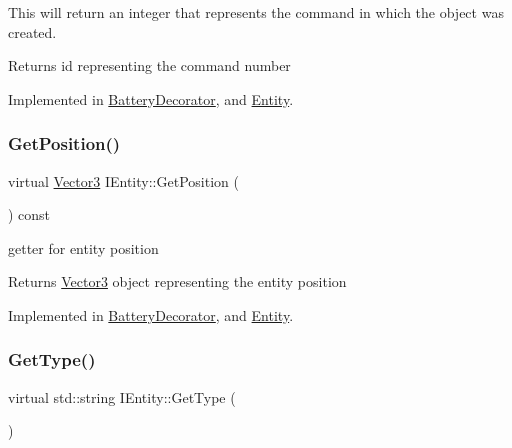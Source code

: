 This will return an integer that represents the command in which the object was created. 

\begin{DoxyReturn}{Returns}
id representing the command number 
\end{DoxyReturn}


Implemented in \hyperlink{classBatteryDecorator_a0a9d1aedcbbff75c0a88612cb4604fb3}{Battery\+Decorator}, and \hyperlink{classEntity_a0040a9ca2da893a4eccec20f542220a9}{Entity}.

\mbox{\label{classIEntity_a9bc32587aab91761fc0e718612498199}} 
\subsubsection{\texorpdfstring{Get\+Position()}{GetPosition()}}
{\footnotesize\ttfamily virtual \hyperlink{classVector3}{Vector3} I\+Entity\+::\+Get\+Position (\begin{DoxyParamCaption}{ }\end{DoxyParamCaption}) const\hspace{0.3cm}{\ttfamily [pure virtual]}}



getter for entity position 

\begin{DoxyReturn}{Returns}
\hyperlink{classVector3}{Vector3} object representing the entity position 
\end{DoxyReturn}


Implemented in \hyperlink{classBatteryDecorator_aaf2487adf2d58e855268877427cf5ba9}{Battery\+Decorator}, and \hyperlink{classEntity_ac6916016f6b9b4b4d18fd988a373fddb}{Entity}.

\mbox{\label{classIEntity_ac494bb9712d5a03495a1a95afdbd7153}} 
\subsubsection{\texorpdfstring{Get\+Type()}{GetType()}}
{\footnotesize\ttfamily virtual std\+::string I\+Entity\+::\+Get\+Type (\begin{DoxyParamCaption}{ }\end{DoxyParamCaption})\hspace{0.3cm}{\ttfamily [pure virtual]}}



